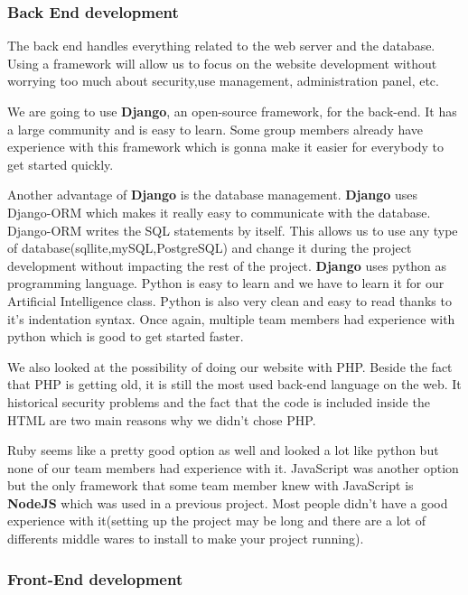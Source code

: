 \iffalse
\subsubsection{Back End development}
The back end handles everything related to the web server and the database. Using a framework will allow us to focus on the website development without worrying too much about security,use management, administration panel, etc.\newline

We are going to use \textbf{Django}, an open-source framework, for the back-end. It has a large community and is easy to learn. Some group members already have experience with this framework which is gonna make it easier for everybody to get started quickly.\newline

Another advantage of \textbf{Django} is the database management. \textbf{Django} uses Django-ORM which makes it really easy to communicate with the database. Django-ORM writes the SQL statements by itself. This allows us to use any type of database(sqllite,mySQL,PostgreSQL) and change it during the project development without impacting the rest of the project.
\textbf{Django} uses python as programming language. Python is easy to learn and we have to learn it for our Artificial Intelligence class.
Python is also very clean and easy to read thanks to it's indentation syntax. Once again, multiple team members had experience with python which is good to get started faster.\newline

We also looked at the possibility of doing our website with PHP. Beside the fact that PHP is getting old, it is still the most used back-end language on the web. It historical security problems and the fact that the code is included inside the HTML are two main reasons why we didn't chose PHP.\newline

Ruby seems like a pretty good option as well and looked a lot like python but none of our team members had experience with it. JavaScript was another option but the only framework that some team member knew with JavaScript is \textbf{NodeJS} which was used in a previous project. Most people didn't have a good experience with it(setting up the project may be long and there are a lot of differents middle wares to install to make your project running).

\subsubsection{Front-End development}

